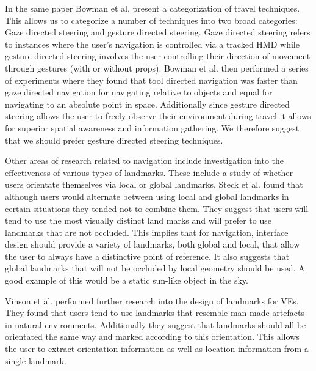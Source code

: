 \documentclass{sig-alternate-05-2015}
\begin{document}
 In the same paper Bowman et al. present a categorization of travel techniques\cite{Bowman1997}. This allows us to categorize a number of techniques into two broad categories: Gaze directed steering and gesture directed steering. Gaze directed steering refers to instances where the user's navigation is controlled via a tracked HMD while gesture directed  steering involves the user controlling their direction of movement through gestures (with or without props). Bowman et al. then performed a series of experiments where they found that tool directed navigation was faster than gaze directed navigation for navigating relative to objects and equal for navigating to an absolute point in space. Additionally since gesture directed steering allows the user to freely observe their environment during travel it allows for superior spatial awareness and information gathering. We therefore suggest that we should prefer gesture directed steering techniques.

Other areas of research related to navigation include investigation into the effectiveness of various types of landmarks. These include a study of whether users orientate themselves via local or global landmarks\cite{Steck2000}. Steck et al. found that although users would alternate between using local and global landmarks in certain situations they tended not to combine them. They suggest that users will tend to use the most visually distinct land marks and will prefer to use landmarks that are not occluded. This implies that for navigation, interface design should provide a variety of landmarks, both global and local, that allow the user to always have a distinctive point of reference. It also suggests that global landmarks that will not be occluded by local geometry should be used. A good example of this would be a static sun-like object in the sky.

Vinson et al. performed further research into the design of landmarks for VEs.\cite{Vinson1999} They found that users tend to use landmarks that resemble man-made artefacts in natural environments. Additionally they suggest that landmarks should all be orientated the same way and marked according to this orientation. This allows the user to extract orientation information as well as location information from a single landmark.
\end{document}
